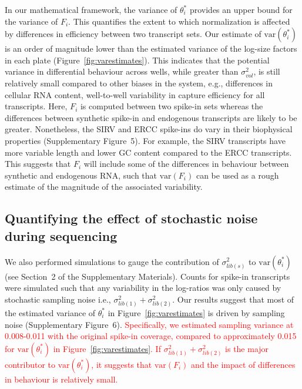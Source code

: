 \documentclass{article}
\newcommand{\suppfigbiophys}{5}
\newcommand{\suppfignoise}{6}
\newcommand{\suppsecnoise}{2}
\newcommand{\revised}[1]{\textcolor{red}{#1}}
\newcommand\variance{\mbox{var}}
\begin{document}
In our mathematical framework, the variance of $\theta^*_i$ provides an upper bound for the variance of $F_i$.
This quantifies the extent to which normalization is affected by differences in efficiency between two transcript sets.
Our estimate of $\variance(\theta^*_i)$ is an order of magnitude lower than the estimated variance of the log-size factors in each plate (Figure~\ref{fig:varestimates}).
This indicates that the potential variance in differential behaviour across wells, while greater than $\sigma^2_{vol}$, is still relatively small compared to other biases in the system, e.g., differences in cellular RNA content, well-to-well variability in capture efficiency for all transcripts.
Here, $F_i$ is computed between two spike-in sets whereas the differences between synthetic spike-in and endogenous transcripts are likely to be greater.
Nonetheless, the SIRV and ERCC spike-ins do vary in their biophysical properties (Supplementary Figure~\suppfigbiophys{}).
For example, the SIRV transcripts have more variable length and lower GC content compared to the ERCC transcripts.
This suggests that $F_i$ will include some of the differences in behaviour between synthetic and endogenous RNA, such that $\variance(F_i)$ can be used as a rough estimate of the magnitude of the associated variability.

\subsection*{Quantifying the effect of stochastic noise during sequencing}
We also performed simulations to gauge the contribution of $\sigma^2_{lib(s)}$ to $\variance(\theta^*_i)$ (see Section~\suppsecnoise{} of the Supplementary Materials).
Counts for spike-in transcripts were simulated such that any variability in the log-ratios was only caused by stochastic sampling noise i.e., $\sigma^2_{lib(1)} + \sigma^2_{lib(2)}$.
Our results suggest that most of the estimated variance of $\theta^*_i$ in Figure~\ref{fig:varestimates} is driven by sampling noise (Supplementary Figure~\suppfignoise{}).
\revised{Specifically, we estimated sampling variance at 0.008-0.011 with the original spike-in coverage, compared to approximately 0.015 for $\variance(\theta^*_i)$ in Figure~\ref{fig:varestimates}.
If $\sigma^2_{lib(1)} + \sigma^2_{lib(2)}$ is the major contributor to $\variance(\theta^*_i)$, it suggests that $\variance(F_i)$ and the impact of differences in behaviour is relatively small.}
\end{document}

